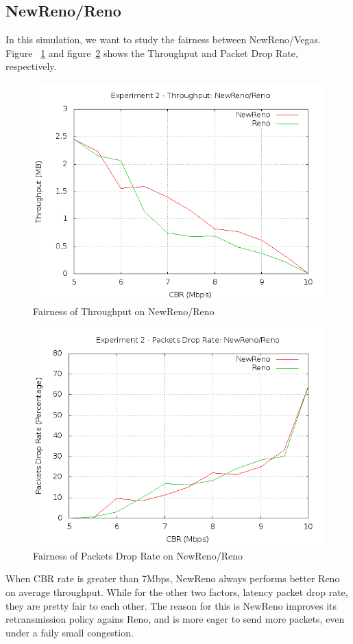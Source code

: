 \documentclass[10pt, conference]{lib/IEEEtran}
\begin{document}
\subsection{NewReno/Reno}
In this simulation, we want to study the fairness between NewReno/Vegas.
Figure ~\ref{fig:exp2_thp_nr} and figure~\ref{fig:exp2_dr_nr} shows the Throughput and Packet Drop Rate, respectively.
\begin{figure}[H]
    \centering
    \includegraphics[width=1.0\linewidth]{plot/exp2-thp-NewReno-Reno.png}
    \caption{Fairness of Throughput on NewReno/Reno}
    \label{fig:exp2_thp_nr}
\end{figure}
\begin{figure}[H]
    \centering
    \includegraphics[width=1.0\linewidth]{plot/exp2-dr-NewReno-Reno.png}
    \caption{Fairness of Packets Drop Rate on NewReno/Reno}
    \label{fig:exp2_dr_nr}
\end{figure}
When CBR rate is greater than 7Mbps, NewReno always performs better 
Reno on average throughput. While for the other two factors, latency 
packet drop rate, they are pretty fair to each other. The reason for
this is NewReno improves its retransmission policy agains Reno, and 
is more eager to send more packets, even under a faily small congestion.
\end{document}
